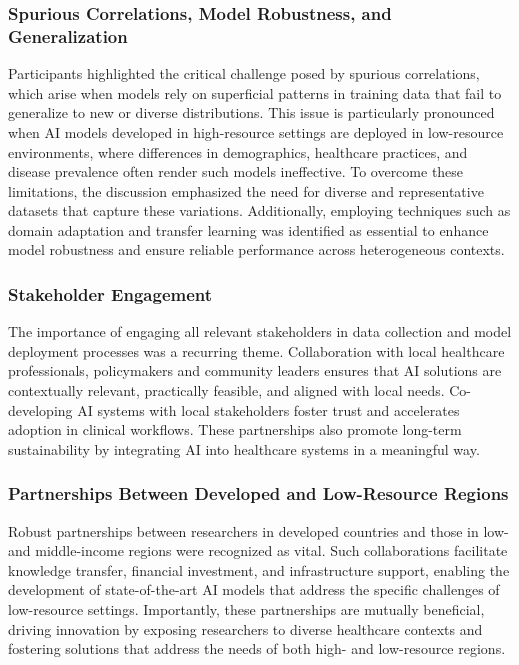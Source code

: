 \subsubsection{Spurious Correlations, Model Robustness, and Generalization}

Participants highlighted the critical challenge posed by spurious correlations, which arise when models rely on superficial patterns in training data that fail to generalize to new or diverse distributions. This issue is particularly pronounced when AI models developed in high-resource settings are deployed in low-resource environments, where differences in demographics, healthcare practices, and disease prevalence often render such models ineffective. To overcome these limitations, the discussion emphasized the need for diverse and representative datasets that capture these variations. Additionally, employing techniques such as domain adaptation and transfer learning was identified as essential to enhance model robustness and ensure reliable performance across heterogeneous contexts.

\subsubsection{Stakeholder Engagement}
The importance of engaging all relevant stakeholders in data collection and model deployment processes was a recurring theme. Collaboration with local healthcare professionals, policymakers and community leaders ensures that AI solutions are contextually relevant, practically feasible, and aligned with local needs. Co-developing AI systems with local stakeholders foster trust and accelerates adoption in clinical workflows. These partnerships also promote long-term sustainability by integrating AI into healthcare systems in a meaningful way.

\subsubsection{Partnerships Between Developed and Low-Resource Regions}
Robust partnerships between researchers in developed countries and those in low- and middle-income regions were recognized as vital. Such collaborations facilitate knowledge transfer, financial investment, and infrastructure support, enabling the development of state-of-the-art AI models that address the specific challenges of low-resource settings. Importantly, these partnerships are mutually beneficial, driving innovation by exposing researchers to diverse healthcare contexts and fostering solutions that address the needs of both high- and low-resource regions.


